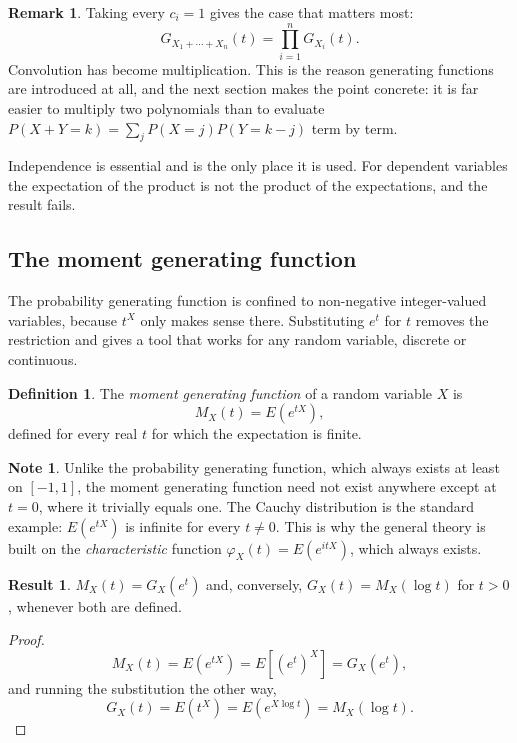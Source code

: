 \documentclass[11pt,a4paper]{article}
\theoremstyle{definition}
\newtheorem{defn}[thm]{Definition}
\newtheorem{result}[thm]{Result}
\newtheorem*{note}{Note}
\newtheorem*{remark}{Remark}
\begin{document}
\begin{remark}
Taking every $c_i = 1$ gives the case that matters most:
$$G_{X_1+\cdots+X_n}(t) = \prod_{i=1}^{n}G_{X_i}(t).$$
Convolution has become multiplication. This is the reason generating functions
are introduced at all, and the next section makes the point concrete: it is far
easier to multiply two polynomials than to evaluate
$P(X+Y=k) = \sum_j P(X=j)P(Y=k-j)$ term by term.

Independence is essential and is the only place it is used. For dependent
variables the expectation of the product is not the product of the
expectations, and the result fails.
\end{remark}


\subsection{The moment generating function}

The probability generating function is confined to non-negative integer-valued
variables, because $t^{X}$ only makes sense there. Substituting $e^{t}$ for $t$
removes the restriction and gives a tool that works for any random variable,
discrete or continuous.

\begin{defn}
The \emph{moment generating function} of a random variable $X$ is
$$M_X(t) = E\left(e^{tX}\right),$$
defined for every real $t$ for which the expectation is finite.
\end{defn}

\begin{note}
Unlike the probability generating function, which always exists at least on
$[-1,1]$, the moment generating function need not exist anywhere except at
$t=0$, where it trivially equals one. The Cauchy distribution is the standard
example: $E\left(e^{tX}\right)$ is infinite for every $t\neq0$. This is why the
general theory is built on the \emph{characteristic} function
$\varphi_X(t)=E\left(e^{itX}\right)$, which always exists.
\end{note}

\begin{result}
$M_X(t) = G_X\!\left(e^{t}\right)$ and, conversely, $G_X(t) = M_X\left(\log t\right)$
for $t>0$, whenever both are defined.
\end{result}

\begin{proof}
$$M_X(t) = E\left(e^{tX}\right) = E\left[\left(e^{t}\right)^{X}\right] = G_X\!\left(e^{t}\right),$$
and running the substitution the other way,
$$G_X(t) = E\left(t^{X}\right) = E\left(e^{X\log t}\right) = M_X\left(\log t\right).$$
\end{proof}
\end{document}
